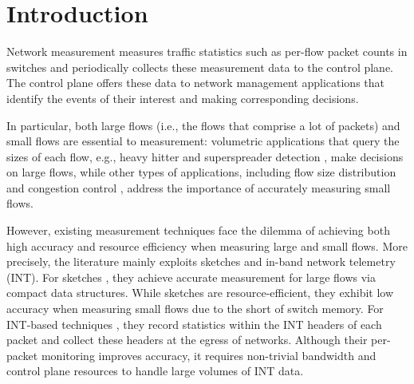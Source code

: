 \section{Introduction}

Network measurement measures traffic statistics such as per-flow packet counts in switches and periodically collects these measurement data to the control plane. The control plane offers these data to network management applications that identify the events of their interest and making corresponding decisions. 

In particular, both large flows (i.e., the flows that comprise a lot of packets) and small flows are essential to measurement: volumetric applications that query the sizes of each flow, e.g., heavy hitter and superspreader detection \cite{liu2016one,huang2017sketchvisor}, make decisions on large flows, while other types of applications, including flow size distribution \cite{chen2021mtp} and congestion control \cite{ben2020pint,sheng2021deltaint}, address the importance of accurately measuring small flows. 



However, existing measurement techniques face the dilemma of achieving both high accuracy and resource efficiency when measuring large and small flows. 
More precisely, the literature mainly exploits sketches and in-band network telemetry (INT). For sketches \cite{li2016flowradar,yang2018elastic,huang2017sketchvisor,huang2018sketchlearn,liu2016one,huang2021toward,liu2019nitrosketch,zhang2021cocosketch,namkung2022sketchlib}, they achieve accurate measurement for large flows via compact data structures. While sketches are resource-efficient, they exhibit low accuracy when measuring small flows due to the short of switch memory. For INT-based techniques \cite{sheng2021deltaint,ben2020pint,handigol2014know,pan2019int,zhu2015packet}, they record statistics within the INT headers of each packet and collect these headers at the egress of networks. Although their per-packet monitoring improves accuracy, it requires non-trivial bandwidth and control plane resources to handle large volumes of INT data. 

